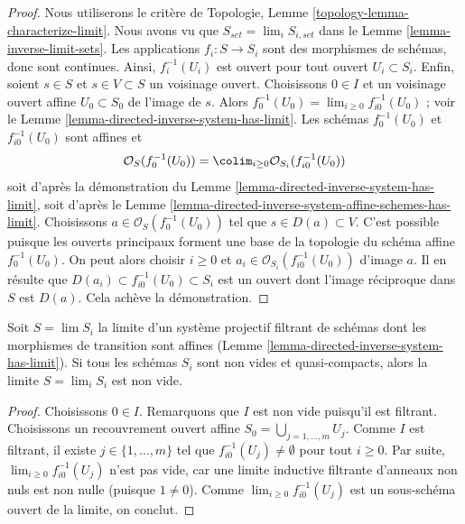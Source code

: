 \begin{proof}
Nous utiliserons le critère de Topologie,
Lemme \ref{topology-lemma-characterize-limit}. Nous avons vu que
$S_{set} = \lim_i S_{i, set}$ dans le
Lemme \ref{lemma-inverse-limit-sets}. Les applications $f_i : S \to S_i$ sont des
morphismes de schémas, donc sont continues. Ainsi, $f_i^{-1}(U_i)$ est
ouvert pour tout ouvert $U_i \subset S_i$. Enfin, soient $s \in S$ et
$s \in V \subset S$ un voisinage ouvert. Choisissons $0 \in I$ et un
voisinage ouvert affine $U_0 \subset S_0$ de l'image de $s$. Alors
$f_0^{-1}(U_0) = \lim_{i \geq 0} f_{i0}^{-1}(U_0)$ ; voir le
Lemme \ref{lemma-directed-inverse-system-has-limit}. Les schémas
$f_0^{-1}(U_0)$ et $f_{i0}^{-1}(U_0)$ sont affines et
$$
\mathcal{O}_S(f_0^{-1}(U_0)) =
\colim_{i \geq 0} \mathcal{O}_{S_i}(f_{i0}^{-1}(U_0))
$$
soit d'après la démonstration du
Lemme \ref{lemma-directed-inverse-system-has-limit}, soit d'après le
Lemme \ref{lemma-directed-inverse-system-affine-schemes-has-limit}.
Choisissons $a \in \mathcal{O}_S(f_0^{-1}(U_0))$ tel que
$s \in D(a) \subset V$. C'est possible puisque les ouverts principaux
forment une base de la topologie du schéma affine $f_0^{-1}(U_0)$.
On peut alors choisir $i \geq 0$ et
$a_i \in \mathcal{O}_{S_i}(f_{i0}^{-1}(U_0))$ d'image $a$. Il en résulte
que $D(a_i) \subset f_{i0}^{-1}(U_0) \subset S_i$ est un ouvert dont
l'image réciproque dans $S$ est $D(a)$. Cela achève la démonstration.
\end{proof}

\begin{lemma}
\label{lemma-limit-nonempty}
Soit $S = \lim S_i$ la limite d'un système projectif filtrant de schémas
dont les morphismes de transition sont affines
(Lemme \ref{lemma-directed-inverse-system-has-limit}). Si tous les schémas
$S_i$ sont non vides et quasi-compacts, alors la limite
$S = \lim_i S_i$ est non vide.
\end{lemma}

\begin{proof}
Choisissons $0 \in I$. Remarquons que $I$ est non vide puisqu'il est
filtrant. Choisissons un recouvrement ouvert affine
$S_0 = \bigcup_{j = 1, \ldots, m} U_j$. Comme $I$ est filtrant, il existe
$j \in \{1, \ldots, m\}$ tel que
$f_{i0}^{-1}(U_j) \not = \emptyset$ pour tout $i \geq 0$. Par suite,
$\lim_{i \geq 0} f_{i0}^{-1}(U_j)$ n'est pas vide, car une limite
inductive filtrante d'anneaux non nuls est non nulle (puisque
$1 \not = 0$). Comme $\lim_{i \geq 0} f_{i0}^{-1}(U_j)$ est un sous-schéma
ouvert de la limite, on conclut.
\end{proof}

